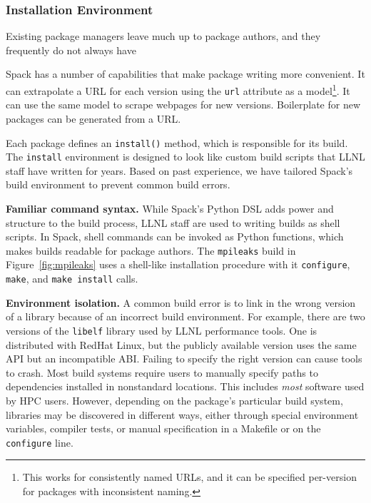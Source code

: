 \subsubsection{Installation Environment}



Existing package managers leave much up to package authors, and they 
frequently do
not always have 


Spack has a number of capabilities that make package writing more 
convenient. It can extrapolate a URL for each version using the {\tt url}
attribute as a model\footnote{This works for consistently named URLs,
and it can be specified per-version for packages with inconsistent naming.}.
It can use the same model to scrape webpages for new versions. 
Boilerplate for new packages can be generated from a URL.



Each package defines an {\tt install()} method, which is responsible
for its build. The {\tt install} environment is designed to look like
custom build scripts that LLNL staff have written for years.  Based on
past experience, we have tailored Spack's build environment to prevent common
build errors.

{\bf Familiar command syntax.} While Spack's Python DSL adds power and 
structure to the build process, LLNL staff are used to writing 
builds as shell scripts.  In Spack, shell commands can be invoked as
Python functions, which makes builds readable for package authors.
The {\tt mpileaks} build in Figure~\ref{fig:mpileaks} uses a 
shell-like installation procedure with it {\tt configure},
{\tt make}, and {\tt make install} calls.

{\bf Environment isolation.}
A common build error is to link in the wrong version of a library because
of an incorrect build environment.
%
For example, there are two versions of the {\tt libelf} library used by
LLNL performance tools. One is distributed with RedHat Linux, but the
publicly available version uses the same API but an incompatible ABI.
Failing to specify the right version can cause tools to crash.
%
Most build systems require users to manually specify paths to dependencies
installed in nonstandard locations.  This includes {\it most} software used
by HPC users.  However, depending on the package's particular build system,
libraries may be discovered
in different ways, either through special environment variables, compiler tests,
or manual specification in a Makefile or on the {\tt configure} line.

